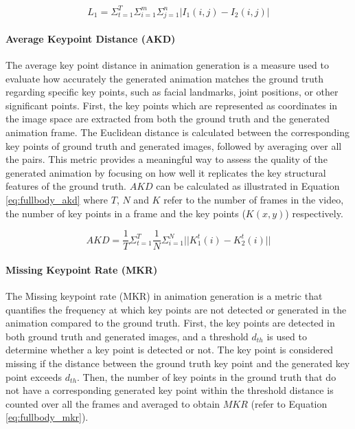 \begin{equation}
    L_1 = \Sigma_{t=1}^T \Sigma_{i=1}^m \Sigma_{j=1}^n | I_1 (i,j) - I_2 (i,j) |
    \label{eq:fullbody_l1}
\end{equation}


\paragraph{Average Keypoint Distance (AKD)}

The average key point distance in animation generation is a measure used to evaluate how accurately the generated animation matches the ground truth regarding specific key points, such as facial landmarks, joint positions, or other significant points. First, the key points which are represented as coordinates in the image space are extracted from both the ground truth and the generated animation frame. The Euclidean distance is calculated between the corresponding key points of ground truth and generated images, followed by averaging over all the pairs. This metric provides a meaningful way to assess the quality of the generated animation by focusing on how well it replicates the key structural features of the ground truth. $AKD$ can be calculated as illustrated in Equation \ref{eq:fullbody_akd} where $T$, $N$ and $K$ refer to the number of frames in the video, the number of key points in a frame and the key points ($K(x,y)$) respectively.

\begin{equation}
    AKD = \frac{1}{T} \Sigma_{t=1}^T \frac{1}{N} \Sigma_{i=1}^N || K_1^t(i) - K_2^t(i)||
    \label{eq:fullbody_akd}
\end{equation}

\paragraph{Missing Keypoint Rate (MKR)}

The Missing keypoint rate (MKR) in animation generation is a metric that quantifies the frequency at which key points are not detected or generated in the animation compared to the ground truth. First, the key points are detected in both ground truth and generated images, and a threshold $d_{th}$ is used to determine whether a key point is detected or not. The key point is considered missing if the distance between the ground truth key point and the generated key point exceeds $d_{th}$. Then, the number of key points in the ground truth that do not have a corresponding generated key point within the threshold distance is counted over all the frames and averaged to obtain $MKR$ (refer to Equation \ref{eq:fullbody_mkr}). 

